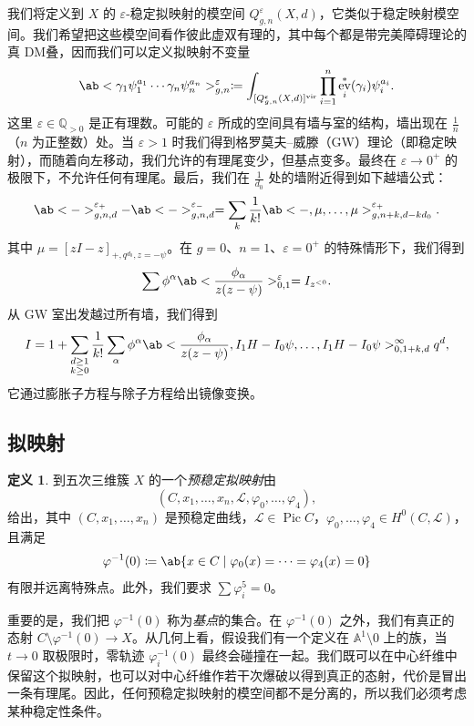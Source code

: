 \documentclass{amsart}
\theoremstyle{definition}
\newtheorem{defn}[thm]{定义}
\theoremstyle{remark}
\theoremstyle{plain}
\theoremstyle{definition}
\theoremstyle{remark}
\newcommand{\A}{\mathbb{A}}
\newcommand{\Q}{\mathbb{Q}}
\newcommand{\ep}{\varepsilon}
\newcommand{\mc}[1]{\mathcal{#1}}
\newcommand{\mr}[1]{\mathrm{#1}}
\newcommand{\1}{\mathbf{1}}
\newcommand{\2}{\mathbf{2}}
\newcommand{\3}{\mathbf{3}}
\newcommand{\vir}{\mr{vir}}
\DeclareMathOperator{\Pic}{Pic}
\DeclareMathOperator{\ev}{ev}
\begin{document}
我们将定义到 \(X\) 的 \(\ep\)-稳定拟映射的模空间 \(Q_{g,n}^{\ep}(X, d)\)，它类似于稳定映射模空间。我们希望把这些模空间看作彼此虚双有理的，其中每个都是带完美障碍理论的真 DM叠，因而我们可以定义拟映射不变量
\[ \ab< \gamma_1 \psi_1^{a_1} \cdots \gamma_n \psi_n^{a_n}>_{g,n}^{\ep} \coloneqq \int_{[Q_{g,n}^{\ep}(X,d)]^{\vir}} \prod_{i=1}^n \ev_i^*(\gamma_i) \psi_i^{a_i}. \]
这里 \(\ep \in \Q_{>0}\) 是正有理数。可能的 \(\ep\) 所成的空间具有墙与室的结构，墙出现在 \(\frac{1}{n}\)（\(n\) 为正整数）处。当 \(\ep > 1\) 时我们得到格罗莫夫–威滕（GW）理论（即稳定映射），而随着向左移动，我们允许的有理尾变少，但基点变多。最终在 \(\ep \to 0^+\) 的极限下，不允许任何有理尾。最后，我们在 \(\frac{1}{d_0}\) 处的墙附近得到如下越墙公式：
\[ \ab<->_{g,n,d}^{\ep_+} - \ab<->_{g,n,d}^{\ep_-} = \sum_{k} \frac{1}{k!} \ab<-, \mu, \ldots, \mu>_{g,n+k, d-kd_0}^{\ep_+}. \]
其中 \(\mu = [zI-z]_{+, q^{d_0}, z=-\psi}\)。在 \(g = 0\)、\(n = 1\)、\(\ep = 0^+\) 的特殊情形下，我们得到
\[ \sum \phi^{\alpha} \ab<\frac{\phi_{\alpha}}{z(z-\psi)}>^{\ep}_{0,1} = I_{z^{<0}}. \]
从 GW 室出发越过所有墙，我们得到
\[ I = 1 + \sum_{\substack{d \geq 1 \\ k \geq 0}} \frac{1}{k!} \sum_{\alpha} \phi^{\alpha} \ab< \frac{\phi_{\alpha}}{z(z-\psi)}, I_1 H - I_0 \psi, \ldots, I_1 H - I_0 \psi>_{0,1+k,d}^{\infty} q^d, \]
它通过膨胀子方程与除子方程给出镜像变换。

\subsection{拟映射}%
\label{sub:Quasimaps}

\begin{defn}
    到五次三维簇 \(X\) 的一个\textit{预稳定拟映射}由
    \[(C, x_1, \ldots, x_n, \mc{L}, \varphi_0, \ldots, \varphi_4),\] 
    给出，其中 \((C, x_1, \ldots, x_n)\) 是预稳定曲线，\(\mc{L} \in \Pic C\)，\(\varphi_0, \ldots, \varphi_4 \in H^0(C, \mc{L})\)，且满足
    \[ \varphi^{-1}(0) \coloneqq \ab\{x \in C \mid \varphi_0(x) = \cdots = \varphi_4(x) = 0 \} \]
    有限并远离特殊点。此外，我们要求 \(\sum \varphi_i^5 = 0\)。
\end{defn}

重要的是，我们把 \(\varphi^{-1}(0)\) 称为\textit{基点}的集合。在 \(\varphi^{-1}(0)\) 之外，我们有真正的态射 \(C \setminus \varphi^{-1}(0) \to X\)。从几何上看，假设我们有一个定义在 \(\A^1 \setminus 0\) 上的族，当 \(t \to 0\) 取极限时，零轨迹 \(\varphi_i^{-1}(0)\) 最终会碰撞在一起。我们既可以在中心纤维中保留这个拟映射，也可以对中心纤维作若干次爆破以得到真正的态射，代价是冒出一条有理尾。因此，任何预稳定拟映射的模空间都不是分离的，所以我们必须考虑某种稳定性条件。
\end{document}
